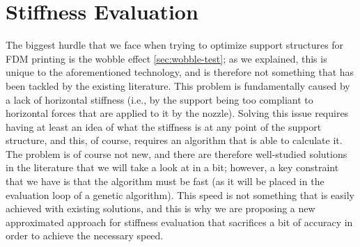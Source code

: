 \chapter{Stiffness Evaluation}
\label{cha:stiffness_algo}

The biggest hurdle that we face when trying to optimize support structures for FDM printing is the
wobble effect \cref{sec:wobble-test}; as we explained, this is unique to the aforementioned
technology, and is therefore not something that has been tackled by the existing literature.
This problem is fundamentally caused by a lack of horizontal stiffness (i.e., by the support being too compliant
to horizontal forces that are applied to it by the nozzle).
Solving this issue requires having at least an idea of what the stiffness is at any point of the support structure,
and this, of course, requires an algorithm that is able to calculate it.
The problem is of course not new, and there are therefore well-studied solutions in the literature that we will take a look at
in a bit; however, a key constraint that we have is that the algorithm must be fast (as it will be placed in the
evaluation loop of a genetic algorithm). This speed is not something that is easily achieved with existing solutions,
and this is why we are proposing a new approximated approach for stiffness evaluation that sacrifices a bit of accuracy
in order to achieve the necessary speed.

